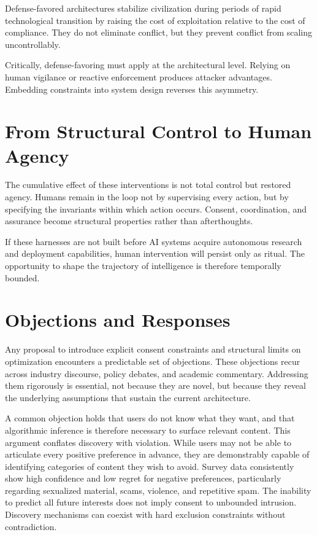 \documentclass[11pt,oneside]{article}
\begin{document}
Defense-favored architectures stabilize civilization during periods of rapid technological transition by raising the cost of exploitation relative to the cost of compliance. They do not eliminate conflict, but they prevent conflict from scaling uncontrollably.

Critically, defense-favoring must apply at the architectural level. Relying on human vigilance or reactive enforcement produces attacker advantages. Embedding constraints into system design reverses this asymmetry.

\section{From Structural Control to Human Agency}

The cumulative effect of these interventions is not total control but restored agency. Humans remain in the loop not by supervising every action, but by specifying the invariants within which action occurs. Consent, coordination, and assurance become structural properties rather than afterthoughts.

If these harnesses are not built before AI systems acquire autonomous research and deployment capabilities, human intervention will persist only as ritual. The opportunity to shape the trajectory of intelligence is therefore temporally bounded.

\section{Objections and Responses}

Any proposal to introduce explicit consent constraints and structural limits on optimization encounters a predictable set of objections. These objections recur across industry discourse, policy debates, and academic commentary. Addressing them rigorously is essential, not because they are novel, but because they reveal the underlying assumptions that sustain the current architecture.

A common objection holds that users do not know what they want, and that algorithmic inference is therefore necessary to surface relevant content. This argument conflates discovery with violation. While users may not be able to articulate every positive preference in advance, they are demonstrably capable of identifying categories of content they wish to avoid. Survey data consistently show high confidence and low regret for negative preferences, particularly regarding sexualized material, scams, violence, and repetitive spam. The inability to predict all future interests does not imply consent to unbounded intrusion. Discovery mechanisms can coexist with hard exclusion constraints without contradiction.
\end{document}

